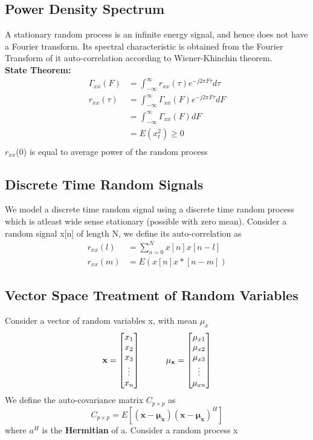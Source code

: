 \subsection{Power Density Spectrum}

A stationary random process is an infinite energy signal, and hence does not have a Fourier transform. Its spectral characteristic is obtained from the Fourier Transform of it auto-correlation according to Wiener-Khinchin theorem.
\\ \textbf{State Theorem: }
\begin{align*}
 \Gamma_{xx}(F) &= \int_{-\infty}^{\infty} r_{xx}(\tau)e^{-j2\pi F\tau} d\tau\\
 r_{xx}(\tau) &= \int_{-\infty}^{\infty} \Gamma_{xx}(F)e^{-j2\pi F\tau} dF \\
 				&= \int_{-\infty}^{\infty} \Gamma_{xx}(F) dF \\
				&= E(x^2_t)  \geq 0 \\
 \end{align*}
$r_{xx}$(0) is equal to average power of the random process

\subsection{Discrete Time Random Signals}
We model a discrete time random signal using a discrete time random process which is atleast wide sense stationary (possible with zero mean).
Consider a random signal x[n] of length N, we define its auto-correlation as
\begin{align*}
 r_{xx}(l) &= \sum_{n=0}^{N} x[n]x[n-l] \\
 r_{xx}(m) &= E(x[n]x*[n-m]) 
\end{align*}
\subsection{Vector Space Treatment of Random Variables}
Consider a vector of random variables x, with mean $\mu_x$
\[
\mathbf{x}=
  \begin{bmatrix}
    x_1 \\
    x_2 \\
    x_3 \\
    \vdots \\
    x_n
  \end{bmatrix}
  \indent\indent \mathbf{\mu_x} =
  \begin{bmatrix}
    \mu_{x1} \\
    \mu_{x2} \\
    \mu_{x3} \\
    \vdots \\
    \mu_{xn}
  \end{bmatrix}
\]
We define the auto-covariance matrix $C_{p\times p}$ as $$ C_{p\times p} = E[(\mathbf{x}-\mathbf{\mu_x})(\mathbf{x}-\mathbf{\mu_x})^H]$$
where $a^H$ is the \textbf{Hermitian} of a. Consider a random process x

